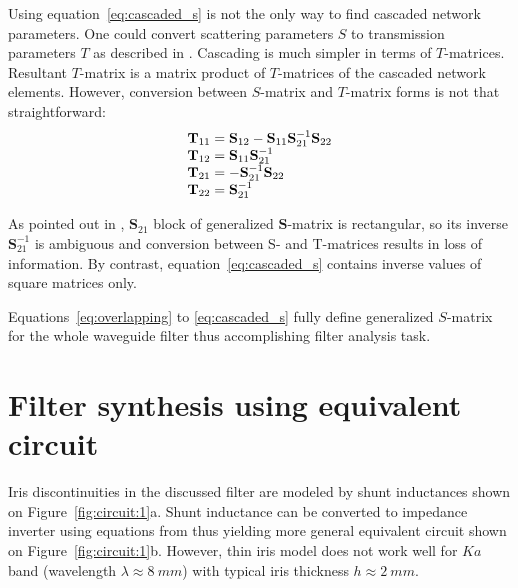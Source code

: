 \documentclass{pj}
\begin{document}
Using equation~\eqref{eq:cascaded_s} is not the only way to find
cascaded network parameters. One could convert scattering parameters
$S$ to transmission parameters $T$ as described in
\cite{frei2008}. Cascading is much simpler in terms of
$T$-matrices. Resultant $T$-matrix is a matrix product of
$T$-matrices of the cascaded network elements. However, conversion
between $S$-matrix and $T$-matrix forms is not that straightforward:
\begin{equation}
  \label{eq:s_to_t}
  \begin{array}{r@{}l}
    \mathbf{T}_{11} &{}= \mathbf{S}_{12} - \mathbf{S}_{11}\mathbf{S}_{21}^{-1}\mathbf{S}_{22} \\
    \mathbf{T}_{12} &{}= \mathbf{S}_{11}\mathbf{S}_{21}^{-1} \\
    \mathbf{T}_{21} &{}= -\mathbf{S}_{21}^{-1}\mathbf{S}_{22} \\
    \mathbf{T}_{22} &{}= \mathbf{S}_{21}^{-1}
  \end{array}
\end{equation}

As pointed out in \cite{frei2008}, $\mathbf{S}_{21}$ block of
generalized $\mathbf{S}$-matrix is rectangular, so its inverse
$\mathbf{S}_{21}^{-1}$ is ambiguous and conversion between S- and
T-matrices results in loss of information. By contrast,
equation~\eqref{eq:cascaded_s} contains inverse values of square
matrices only.

Equations~\eqref{eq:overlapping} to \eqref{eq:cascaded_s} fully define
generalized $S$-matrix for the whole waveguide filter thus
accomplishing filter analysis task.

\section{Filter synthesis using equivalent circuit}
\label{sec:filter-synth}

Iris discontinuities in the discussed filter are modeled by shunt
inductances shown on Figure~\ref{fig:circuit:1}a. Shunt inductance can
be converted to impedance inverter using equations from
\cite{pozar2012microwave} thus yielding more general equivalent
circuit shown on Figure~\ref{fig:circuit:1}b. However, thin iris model
does not work well for $Ka$ band (wavelength $\lambda \approx 8~mm$)
with typical iris thickness $h \approx 2~mm$.
\end{document}
